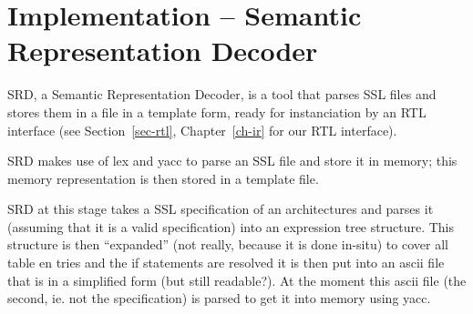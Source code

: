 \section{Implementation -- Semantic Representation Decoder}
\label{sec-srd}
SRD, a Semantic Representation Decoder, is a tool that parses
SSL files and stores them in a file in a template form, 
ready for instanciation by an RTL interface (see Section~\ref{sec-rtl},
Chapter~\ref{ch-ir} for our RTL interface).

SRD makes use of lex and yacc to parse an SSL file and store
it in memory; this memory representation is then stored in
a template file.  

SRD at this stage takes a SSL specification of an architectures and parses
it (assuming that it is a valid specification) into an expression tree
structure. This structure is then ``expanded'' (not really, because it is
done in-situ) to cover all table en tries and the if statements are
resolved it is then put into an ascii file that is in a simplified form
(but still readable?). At the moment this ascii file (the second, ie. not
the specification) is parsed to get it into memory using yacc. 

